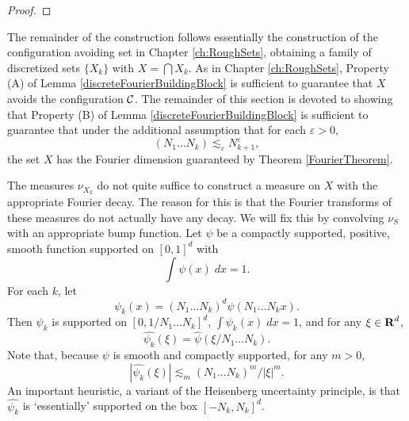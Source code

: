 \begin{proof}
\begin{comment}
    Combining \eqref{fourierdim1}, \eqref{fourierdim2}, and \eqref{fourierdim3}, we conclude that there exists a constant $C$ such that with probability at least
    \[ 1 - 2 \exp \left( \frac{-N^{d-s/n}}{A^{1/n} (\log N)^{1/n}} \right) - 1/\log N - \frac{2^{d+1}}{N^{c \log N - d}} \geq 1 - C / \log N, \]
    the set $X$ avoids $K$, and for all $m \in \{ -N, \dots, N \}^d$,
    \[ |\widehat{f}(m)| \leq \frac{C (\log N)^{1-1/n}}{N^{d-s/n}}. \qedhere \]
\end{comment}
\end{proof}

The remainder of the construction follows essentially the construction of the configuration avoiding set in Chapter \ref{ch:RoughSets}, obtaining a family of discretized sets $\{ X_k \}$ with $X = \bigcap X_k$. As in Chapter \ref{ch:RoughSets}, Property (A) of Lemma \eqref{discreteFourierBuildingBlock} is sufficient to guarantee that $X$ avoids the configuration $\operatorname{\mathcal{C}}$. The remainder of this section is devoted to showing that Property (B) of Lemma \eqref{discreteFourierBuildingBlock} is sufficient to guarantee that under the additional assumption that for each $\varepsilon > 0$,
%
\begin{equation} \label{equation41028694692} (N_1 \dots N_k) \lesssim_\varepsilon N_{k+1}^\varepsilon, \end{equation}
%
the set $X$ has the Fourier dimension guaranteed by Theorem \ref{FourierTheorem}.

The measures $\nu_{X_k}$ do not quite suffice to construct a measure on $X$ with the appropriate Fourier decay. The reason for this is that the Fourier transforms of these measures do not actually have any decay. We will fix this by convolving $\nu_S$ with an appropriate bump function. Let $\psi$ be a compactly supported, positive, smooth function supported on $[0,1]^d$ with
%
\[ \int \psi(x)\; dx = 1. \]
%
For each $k$, let
%
\[ \psi_k(x) = (N_1 \dots N_k)^d \psi(N_1 \dots N_k x). \]
%
Then $\psi_k$ is supported on $[0,1/N_1 \dots N_k]^d$, $\int \psi_k(x)\; dx = 1$, and for any $\xi \in \operatorname{\mathbf{R}}^d$,
%
\[ \widehat{\psi_k}(\xi) = \widehat{\psi}(\xi/N_1 \dots N_k). \]
%
Note that, because $\psi$ is smooth and compactly supported, for any $m > 0$,
%
\[ |\widehat{\psi_k}(\xi)| \lesssim_m (N_1 \dots N_k)^m / |\xi|^m. \]
%
An important heuristic, a variant of the Heisenberg uncertainty principle, is that $\widehat{\psi_k}$ is `essentially' supported on the box $[-N_k,N_k]^d$.

